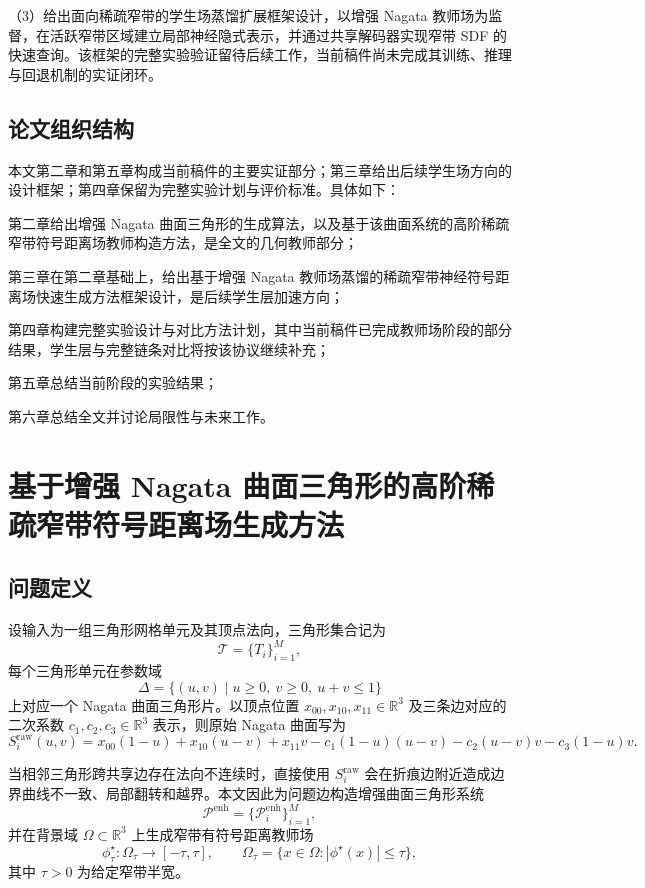\documentclass[12pt,oneside]{ctexbook}
\begin{document}
（3）给出面向稀疏窄带的学生场蒸馏扩展框架设计，以增强 Nagata 教师场为监督，在活跃窄带区域建立局部神经隐式表示，并通过共享解码器实现窄带 SDF 的快速查询。该框架的完整实验验证留待后续工作，当前稿件尚未完成其训练、推理与回退机制的实证闭环。

\section{论文组织结构}
本文第二章和第五章构成当前稿件的主要实证部分；第三章给出后续学生场方向的设计框架；第四章保留为完整实验计划与评价标准。具体如下：

第二章给出增强 Nagata 曲面三角形的生成算法，以及基于该曲面系统的高阶稀疏窄带符号距离场教师构造方法，是全文的几何教师部分；

第三章在第二章基础上，给出基于增强 Nagata 教师场蒸馏的稀疏窄带神经符号距离场快速生成方法框架设计，是后续学生层加速方向；

第四章构建完整实验设计与对比方法计划，其中当前稿件已完成教师场阶段的部分结果，学生层与完整链条对比将按该协议继续补充；

第五章总结当前阶段的实验结果；

第六章总结全文并讨论局限性与未来工作。

\chapter{基于增强 Nagata 曲面三角形的高阶稀疏窄带符号距离场生成方法}
\section{问题定义}
设输入为一组三角形网格单元及其顶点法向，三角形集合记为
\[
\mathcal{T}=\{T_i\}_{i=1}^{M},
\]
每个三角形单元在参数域
\[
\Delta=\{(u,v)\mid u\ge 0,\ v\ge 0,\ u+v\le 1\}
\]
上对应一个 Nagata 曲面三角形片。以顶点位置 $x_{00},x_{10},x_{11}\in\mathbb R^3$ 及三条边对应的二次系数 $c_1,c_2,c_3\in\mathbb R^3$ 表示，则原始 Nagata 曲面写为
\[
S_i^{\mathrm{raw}}(u,v)=x_{00}(1-u)+x_{10}(u-v)+x_{11}v-c_1(1-u)(u-v)-c_2(u-v)v-c_3(1-u)v.
\]

当相邻三角形跨共享边存在法向不连续时，直接使用 $S_i^{\mathrm{raw}}$ 会在折痕边附近造成边界曲线不一致、局部翻转和越界。本文因此为问题边构造增强曲面三角形系统
\[
\mathcal{P}^{\mathrm{enh}}=\{\mathcal P_i^{\mathrm{enh}}\}_{i=1}^{M},
\]
并在背景域 $\Omega\subset\mathbb R^3$ 上生成窄带有符号距离教师场
\[
\phi^\star_\tau:\Omega_\tau\rightarrow[-\tau,\tau],
\qquad
\Omega_\tau=\{x\in\Omega: |\phi^\star(x)|\le \tau\},
\]
其中 $\tau>0$ 为给定窄带半宽。
\end{document}

